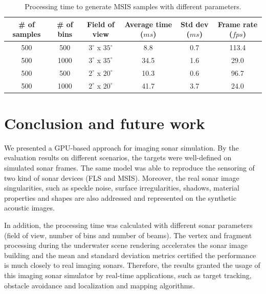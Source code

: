 \documentclass[final,5p,times]{elsarticle}
\begin{document}
\begin{table}
    \caption{Processing time to generate MSIS samples with different parameters.}
    \label{table:msis}
    \begin{center}
        \begin{tabular}{| c | c | c | c | c | c |}
            \hline
            \# of samples & \# of bins & Field of view & Average time ($ms$) & Std dev ($ms$) & Frame rate ($fps$) \\
            \hline
            500     & 500       & $3^{\circ}$ x $35^{\circ}$        & 8.8	    & 0.7  & 113.4 \\ \hline
            500     & 1000      & $3^{\circ}$ x $35^{\circ}$        & 34.5	& 1.6  & 29.0  \\ \hline
            500     & 500       & $2^{\circ}$ x $20^{\circ}$        & 10.3	& 0.6  & 96.7  \\ \hline
            500     & 1000      & $2^{\circ}$ x $20^{\circ}$        & 41.7	& 3.7  & 24.0  \\ \hline
        \end{tabular}
    \end{center}
\end{table}


\section{Conclusion and future work}
\label{conclusion}

We presented a GPU-based approach for imaging sonar simulation. By the evaluation results on different scenarios, the targets were well-defined on simulated sonar frames. The same model was able to reproduce the sensoring of two kind of sonar devices (FLS and MSIS). Moreover, the real sonar image singularities, such as speckle noise, surface irregularities, shadows, material properties and shapes are also addressed and represented on the synthetic acoustic images.

In addition, the processing time was calculated with different sonar parameters (field of view, number of bins and number of beams). The vertex and fragment processing during the underwater scene rendering accelerates the sonar image building and the mean and standard deviation metrics certified the performance is much closely to real imaging sonars. Therefore, the results granted the usage of this imaging sonar simulator by real-time applications, such as target tracking, obstacle avoidance and localization and mapping algorithms.
\end{document}
